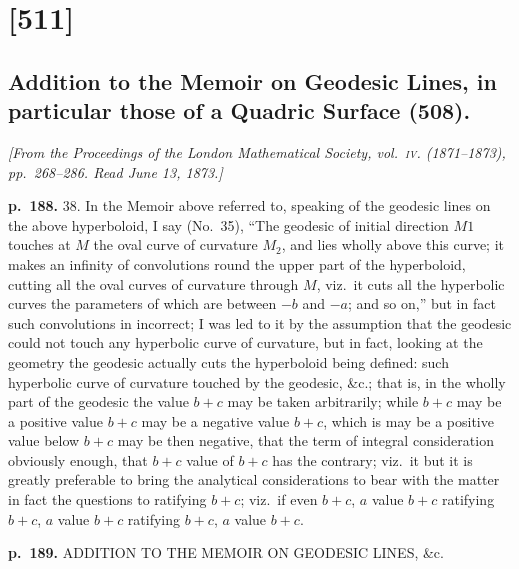 \documentclass[11pt,a4paper]{book}
\begin{document}
\section{[511]}
\subsection{Addition to the Memoir on Geodesic Lines, in particular those of a Quadric Surface (508).}

\begin{center}
\textit{[From the Proceedings of the London Mathematical Society, vol.\ \textsc{iv}. (1871--1873),
pp.\ 268--286.  Read June 13, 1873.]}
\end{center}

\noindent
\textbf{p.~188.}  \textsc{38.}  In the Memoir above referred to, speaking of the geodesic lines on the above hyperboloid, I say (No.\ 35), ``The geodesic of initial direction $M1$ touches at $M$ the oval curve of curvature $M_2$, and lies wholly above this curve; it makes an infinity of convolutions round the upper part of the hyperboloid, cutting all the oval curves of curvature through $M$, viz.\ it cuts all the hyperbolic curves the parameters of which are between $-b$ and $-a$; and so on,'' but in fact such convolutions in incorrect; I was led to it by the assumption that the geodesic could not touch any hyperbolic curve of curvature, but in fact, looking at the geometry the geodesic actually cuts the hyperboloid being defined: such hyperbolic curve of curvature touched by the geodesic, \&c.;
that is, in the wholly part of the geodesic the value $b + c$ may be taken arbitrarily; while $b + c$ may be a positive value $b + c$ may be a negative value $b + c$, which is may be a positive value below $b + c$ may be then negative, that the term of integral consideration obviously enough, that $b + c$ value of $b + c$ has the contrary; viz.\ it but it is greatly preferable to bring the analytical considerations to bear with the matter in fact the questions to ratifying $b + c$; viz.\ if even $b + c$, $a$ value $b + c$ ratifying $b + c$, $a$ value $b + c$ ratifying $b + c$, $a$ value $b + c$.

\clearpage

\noindent
\textbf{p.~189.}  ADDITION TO THE MEMOIR ON GEODESIC LINES, \&c.
\end{document}
